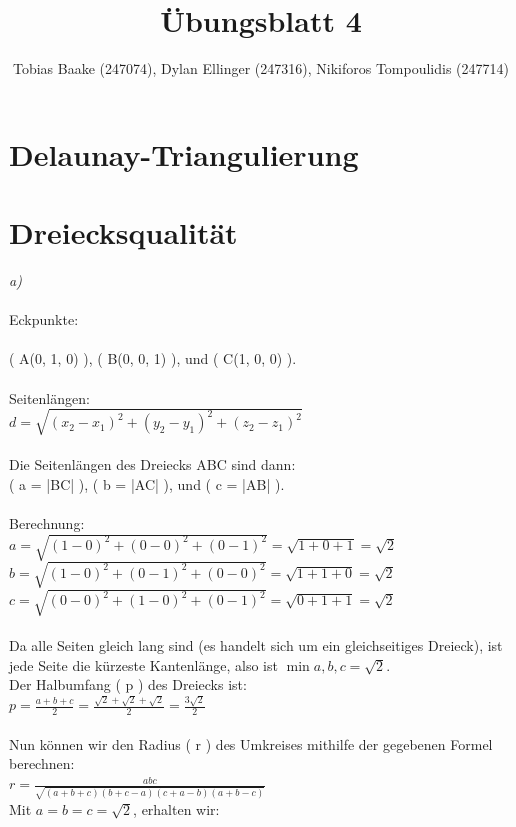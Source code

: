 \documentclass{article}
\title{Übungsblatt 4}
\author{Tobias Baake (247074), Dylan Ellinger (247316), Nikiforos Tompoulidis (247714)}
\begin{document}
\maketitle

\section{Delaunay-Triangulierung}


\section{Dreiecksqualität}
\emph{a)}\\
\\
Eckpunkte:
\\\\
( A(0, 1, 0) ), ( B(0, 0, 1) ), und ( C(1, 0, 0) ).
\\\\
Seitenlängen:
\\
$ d = \sqrt{(x_2-x_1)^2 + (y_2-y_1)^2 + (z_2-z_1)^2} $
\\\\
Die Seitenlängen des Dreiecks ABC sind dann:
\\
( a = |BC| ), ( b = |AC| ), und ( c = |AB| ).
\\\\
Berechnung:
\\
$ a = \sqrt{(1-0)^2 + (0-0)^2 + (0-1)^2} = \sqrt{1+0+1} = \sqrt{2} $
\\
$ b = \sqrt{(1-0)^2 + (0-1)^2 + (0-0)^2} = \sqrt{1+1+0} = \sqrt{2} $
\\
$ c = \sqrt{(0-0)^2 + (1-0)^2 + (0-1)^2} = \sqrt{0+1+1} = \sqrt{2} $
\\
\\
Da alle Seiten gleich lang sind (es handelt sich um ein gleichseitiges Dreieck), ist jede Seite die kürzeste Kantenlänge, also ist $ \min{a, b, c} = \sqrt{2} $.
\\
Der Halbumfang ( p ) des Dreiecks ist:
\\
$ p = \frac{a + b + c}{2} = \frac{\sqrt{2} + \sqrt{2} + \sqrt{2}}{2} = \frac{3\sqrt{2}}{2} $
\\\\
Nun können wir den Radius ( r ) des Umkreises mithilfe der gegebenen Formel berechnen:
\\
$ r = \frac{abc}{\sqrt{(a + b + c)(b + c - a)(c + a - b)(a + b - c)}} $
\\
Mit $ a = b = c = \sqrt{2} $, erhalten wir:
\\
\end{document}

